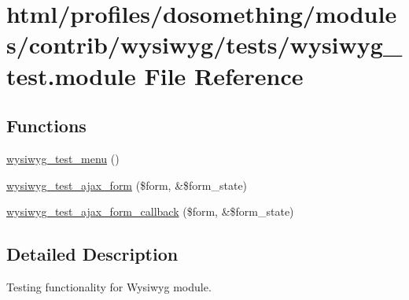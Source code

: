 \hypertarget{wysiwyg__test_8module}{
\section{html/profiles/dosomething/modules/contrib/wysiwyg/tests/wysiwyg\_\-test.module File Reference}
\label{wysiwyg__test_8module}
}
\subsection*{Functions}
\begin{DoxyCompactItemize}
\item 
\hyperlink{wysiwyg__test_8module_a0f529be1b315b2b49df1e3ec4935a152}{wysiwyg\_\-test\_\-menu} ()
\item 
\hyperlink{wysiwyg__test_8module_aa2131e198f204a574c98392f334f416b}{wysiwyg\_\-test\_\-ajax\_\-form} (\$form, \&\$form\_\-state)
\item 
\hyperlink{wysiwyg__test_8module_ab98623d1723f5f650fcab9955657746f}{wysiwyg\_\-test\_\-ajax\_\-form\_\-callback} (\$form, \&\$form\_\-state)
\end{DoxyCompactItemize}


\subsection{Detailed Description}
Testing functionality for Wysiwyg module. 

